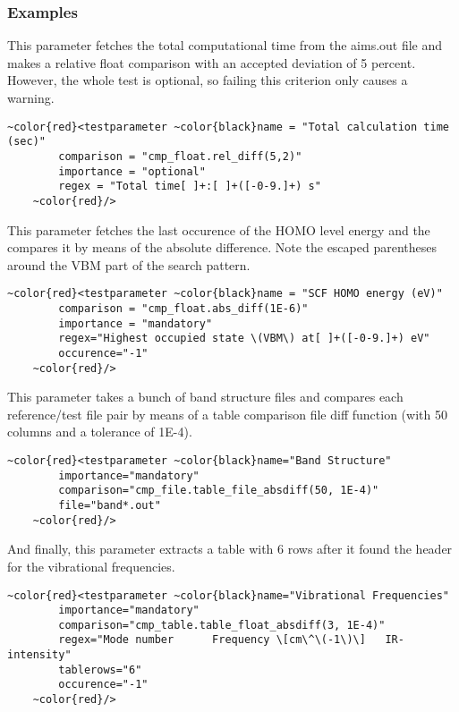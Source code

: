 \documentclass[a4paper,12pt]{scrartcl}
\begin{document}
\subsubsection*{Examples}
This parameter fetches the total computational time from the aims.out file and makes a relative float comparison with
an accepted deviation of 5 percent. However, the whole test is optional, so failing this criterion only causes a
warning.
\begin{Verbatim}[commandchars=~\{\},gobble=4, frame=single, framesep=2mm, label=definition of the total time
testparameter, labelposition=bottomline]
    ~color{red}<testparameter ~color{black}name = "Total calculation time (sec)"
        comparison = "cmp_float.rel_diff(5,2)"
        importance = "optional"
        regex = "Total time[ ]+:[ ]+([-0-9.]+) s"
    ~color{red}/>
\end{Verbatim}
This parameter fetches the last occurence of the HOMO level energy and the compares it by means of the absolute
difference. Note the escaped parentheses around the VBM part of the search pattern.
\begin{Verbatim}[commandchars=~\{\},gobble=4, frame=single, framesep=2mm, label=definition of the SCF HOMO energy
testparameter, labelposition=bottomline]
    ~color{red}<testparameter ~color{black}name = "SCF HOMO energy (eV)"
        comparison = "cmp_float.abs_diff(1E-6)"
        importance = "mandatory"
        regex="Highest occupied state \(VBM\) at[ ]+([-0-9.]+) eV"
        occurence="-1"
    ~color{red}/>
\end{Verbatim}
This parameter takes a bunch of band structure files and compares each reference/test file pair by means of a table
comparison file diff function (with 50 columns and a tolerance of 1E-4).
\begin{Verbatim}[commandchars=~\{\},gobble=4, frame=single, framesep=2mm, label=definition of the band structure
testparameter, labelposition=bottomline]
    ~color{red}<testparameter ~color{black}name="Band Structure"
        importance="mandatory"
        comparison="cmp_file.table_file_absdiff(50, 1E-4)"
        file="band*.out"
    ~color{red}/>
\end{Verbatim}
And finally, this parameter extracts a table with 6 rows after it found the header for the vibrational frequencies.
\begin{Verbatim}[commandchars=~\{\},gobble=4, frame=single, framesep=2mm, label=definition of the DFPT vibrational
frequencies testparameter, labelposition=bottomline]
    ~color{red}<testparameter ~color{black}name="Vibrational Frequencies"
        importance="mandatory"
        comparison="cmp_table.table_float_absdiff(3, 1E-4)"
        regex="Mode number      Frequency \[cm\^\(-1\)\]   IR-intensity"
        tablerows="6"
        occurence="-1"
    ~color{red}/>
\end{Verbatim}
\end{document}
